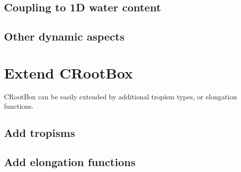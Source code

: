 \documentclass[a4paper]{article}
\begin{document}
\subsection{Coupling to 1D water content}

\subsection{Other dynamic aspects}



\section{Extend CRootBox}

CRootBox can be easily extended by additional tropism types, or elongation functions. 

\subsection{Add tropisms}

\subsection{Add elongation functions}








\end{document}
